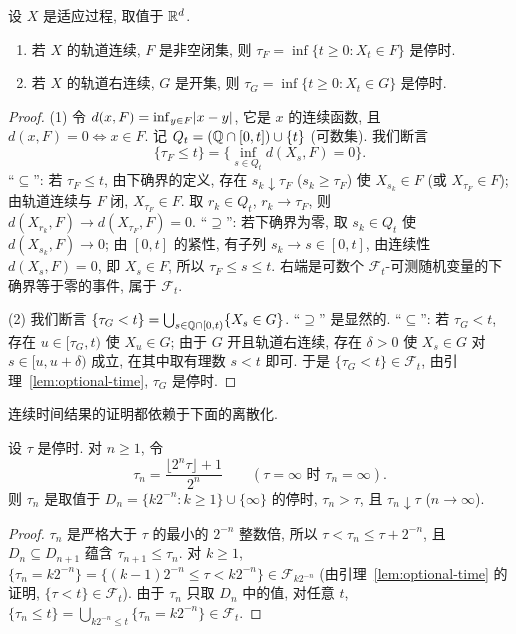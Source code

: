 \begin{proposition}[首达时]\label{prop:hitting-continuous}
设 $X$ 是适应过程, 取值于 $\mathbb{R}^d$.
\begin{enumerate}
\item 若 $X$ 的轨道连续, $F$ 是非空闭集, 则 $\tau_F=\inf\{t\ge0: X_t\in F\}$ 是停时.
\item 若 $X$ 的轨道右连续, $G$ 是开集, 则 $\tau_G=\inf\{t\ge0: X_t\in G\}$ 是停时.
\end{enumerate}
\end{proposition}

\begin{proof}
(1) 令 $d(x,F)=\inf_{y\in F}\lvert x-y\rvert$, 它是 $x$ 的连续函数, 且 $d(x,F)=0\iff x\in F$. 记 $Q_t=(\mathbb{Q}\cap[0,t])\cup\{t\}$ (可数集). 我们断言
\[
\{\tau_F\le t\}=\Big\{\inf_{s\in Q_t}d(X_s,F)=0\Big\}.
\]
``$\subseteq$'': 若 $\tau_F\le t$, 由下确界的定义, 存在 $s_k\downarrow\tau_F$ ($s_k\ge\tau_F$) 使 $X_{s_k}\in F$ (或 $X_{\tau_F}\in F$); 由轨道连续与 $F$ 闭, $X_{\tau_F}\in F$. 取 $r_k\in Q_t$, $r_k\to\tau_F$, 则 $d(X_{r_k},F)\to d(X_{\tau_F},F)=0$. ``$\supseteq$'': 若下确界为零, 取 $s_k\in Q_t$ 使 $d(X_{s_k},F)\to0$; 由 $[0,t]$ 的紧性, 有子列 $s_k\to s\in[0,t]$, 由连续性 $d(X_s,F)=0$, 即 $X_s\in F$, 所以 $\tau_F\le s\le t$. 右端是可数个 $\mathcal{F}_t$-可测随机变量的下确界等于零的事件, 属于 $\mathcal{F}_t$.

(2) 我们断言 $\{\tau_G<t\}=\bigcup_{s\in\mathbb{Q}\cap[0,t)}\{X_s\in G\}$. ``$\supseteq$'' 是显然的. ``$\subseteq$'': 若 $\tau_G<t$, 存在 $u\in[\tau_G,t)$ 使 $X_u\in G$; 由于 $G$ 开且轨道右连续, 存在 $\delta>0$ 使 $X_s\in G$ 对 $s\in[u,u+\delta)$ 成立, 在其中取有理数 $s<t$ 即可. 于是 $\{\tau_G<t\}\in\mathcal{F}_t$, 由引理~\ref{lem:optional-time}, $\tau_G$ 是停时.
\end{proof}

连续时间结果的证明都依赖于下面的离散化.

\begin{lemma}[停时的二进离散化]\label{lem:dyadic-approx}
设 $\tau$ 是停时. 对 $n\ge1$, 令
\[
\tau_n=\frac{\lfloor2^n\tau\rfloor+1}{2^n}\qquad(\tau=\infty\text{ 时 }\tau_n=\infty).
\]
则 $\tau_n$ 是取值于 $D_n=\{k2^{-n}: k\ge1\}\cup\{\infty\}$ 的停时, $\tau_n>\tau$, 且 $\tau_n\downarrow\tau$ ($n\to\infty$).
\end{lemma}

\begin{proof}
$\tau_n$ 是严格大于 $\tau$ 的最小的 $2^{-n}$ 整数倍, 所以 $\tau<\tau_n\le\tau+2^{-n}$, 且 $D_n\subseteq D_{n+1}$ 蕴含 $\tau_{n+1}\le\tau_n$. 对 $k\ge1$, $\{\tau_n=k2^{-n}\}=\{(k-1)2^{-n}\le\tau<k2^{-n}\}\in\mathcal{F}_{k2^{-n}}$ (由引理~\ref{lem:optional-time} 的证明, $\{\tau<t\}\in\mathcal{F}_t$). 由于 $\tau_n$ 只取 $D_n$ 中的值, 对任意 $t$, $\{\tau_n\le t\}=\bigcup_{k2^{-n}\le t}\{\tau_n=k2^{-n}\}\in\mathcal{F}_t$.
\end{proof}

